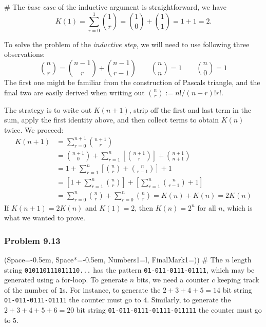 \documentclass[12pt, a4paper]{article}
\newcommand{\listSpace}{-0.5em}%
\begin{document}
{\begin{easylist}[enumerate]
# The \emph{base case} of the inductive argument is straightforward, we have
\begin{equation*}
	K(1) = \sum_{r=0}^{1} \binom{1}{r} = \binom{1}{0} + \binom{1}{1} = 1 + 1 = 2.
\end{equation*}

To solve the problem of the \emph{inductive step}, we will need to use following three observations:
\begin{equation*}
	\binom{n}{r} = \binom{n-1}{r} + \binom{n-1}{r-1}
	\qquad 
	\binom{n}{n} = 1
	\qquad 
	\binom{n}{0} = 1
\end{equation*}
The first one might be familiar from the construction of Pascals triangle, and the final two are easily derived when writing out $\binom{n}{r} := n! / (n-r)! r!$.

The strategy is to write out $K(n+1)$, strip off the first and last term in the sum, apply the first identity above, and then collect terms to obtain $K(n)$ twice.
We proceed:
\begin{align*}
	K(n+1) &= \sum_{r=0}^{n+1} \binom{n+1}{r} \\
	&= \binom{n+1}{0} + \sum_{r=1}^{n} \left[\binom{n+1}{r}\right] + \binom{n+1}{n+1} \\
	&= 1 + \sum_{r=1}^{n} \left[\binom{n}{r} + \binom{n}{r-1}\right] + 1 \\
	&= \left[1 + \sum_{r=1}^{n} \binom{n}{r}\right] +\left[ \sum_{r=1}^{n} \binom{n}{r-1} + 1\right] \\
	&= \sum_{r=0}^{n} \binom{n}{r} + \sum_{r=0}^{n} \binom{n}{r} =
	K(n) + K(n) = 2K(n)
\end{align*}
If $K(n+1) = 2K(n)$ and $K(1) = 2$, then $K(n) = 2^n$ for all $n$, which is what we wanted to prove.
\end{easylist}



\subsubsection*{Problem 9.13}
\begin{easylist}[enumerate]
\ListProperties(Space=\listSpace, Space*=\listSpace, Numbers1=l, FinalMark1={)})
# The $n$ length string \texttt{010110111011110...} has the pattern \texttt{01-011-0111-01111}, which may be generated using a for-loop.
To generate $n$ bits, we need a counter $c$ keeping track of the number of \texttt{1}s. 
For instance, to generate the $2 + 3 + 4 + 5 = 14$ bit string \texttt{01-011-0111-01111} the counter must go to $4$.
Similarly, to generate the $2 + 3 + 4 + 5  + 6= 20$ bit string \texttt{01-011-0111-01111-011111} the counter must go to $5$.


\end{easylist}}
\end{document}
